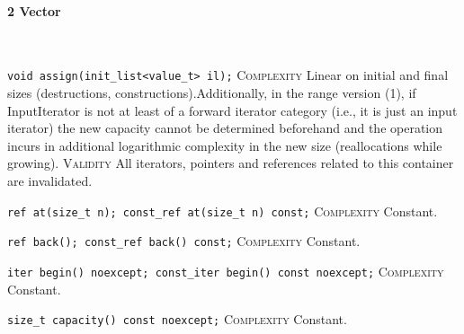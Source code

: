 \paragraph{2 Vector}\mbox{}\vspace{0.5em}\\
\noindent{}\hspace*{0.25em}\lstinline[basicstyle=\ttfamily\color{corange}]{void assign(init_list<value_t> il);} \textsc{Complexity} Linear on initial and final sizes (destructions, constructions).Additionally, in the range version (1), if InputIterator is not at least of a forward iterator category (i.e., it is just an input iterator) the new capacity cannot be determined beforehand and the operation incurs in additional logarithmic complexity in the new size (reallocations while growing). \textsc{Validity} All iterators, pointers and references related to this container are invalidated.\\\vspace{-0.6em}

\noindent{}\hspace*{0.25em}\lstinline[basicstyle=\ttfamily\color{cgreen}]{ref at(size_t n); const_ref at(size_t n) const;} \textsc{Complexity} Constant.\\\vspace{-0.6em}

\noindent{}\hspace*{0.25em}\lstinline[basicstyle=\ttfamily\color{cgreen}]{ref back(); const_ref back() const;} \textsc{Complexity} Constant.\\\vspace{-0.6em}

\noindent{}\hspace*{0.25em}\lstinline[basicstyle=\ttfamily\color{cgreen}]{iter begin() noexcept; const_iter begin() const noexcept;} \textsc{Complexity} Constant.\\\vspace{-0.6em}

\noindent{}\hspace*{0.25em}\lstinline[basicstyle=\ttfamily\color{cgreen}]{size_t capacity() const noexcept;} \textsc{Complexity} Constant.\\\vspace{-0.6em}

